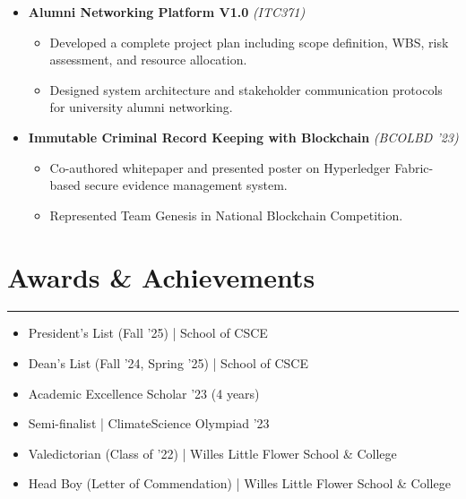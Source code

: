 \documentclass[10pt, a4paper]{article}
\begin{document}
\begin{itemize}[label=\raisebox{0.25ex}{\rule{0.7ex}{0.7ex}}]
    \vspace{8pt}
    
    \item \textbf{Alumni Networking Platform V1.0} \textit{(ITC371)} 
    \begin{itemize}[label=--, nosep]
        \item Developed a complete project plan including scope definition, WBS, risk assessment, and resource allocation.
        \item Designed system architecture and stakeholder communication protocols for university alumni networking.
    \end{itemize}
    
    \vspace{8pt}
    
    \item \textbf{Immutable Criminal Record Keeping with Blockchain} \textit{(BCOLBD '23)}
    \begin{itemize}[label=--, nosep]
        \item Co-authored whitepaper and presented poster on Hyperledger Fabric-based secure evidence management system.
        \item Represented Team Genesis in National Blockchain Competition.
    \end{itemize}
\end{itemize}

\section*{Awards \& Achievements}\vspace{-2pt}\hrule\vspace{6pt}
\begin{itemize}
    \item {President's List} (Fall '25) | School of CSCE
    \item {Dean's List} (Fall '24, Spring '25) | School of CSCE
    \item Academic Excellence Scholar '23 (4 years)
    \item Semi-finalist | ClimateScience Olympiad '23
    \item {Valedictorian} (Class of '22) | Willes Little Flower School \& College
    \item Head Boy (Letter of Commendation) | Willes Little Flower School \& College
\end{itemize}

\end{document}
